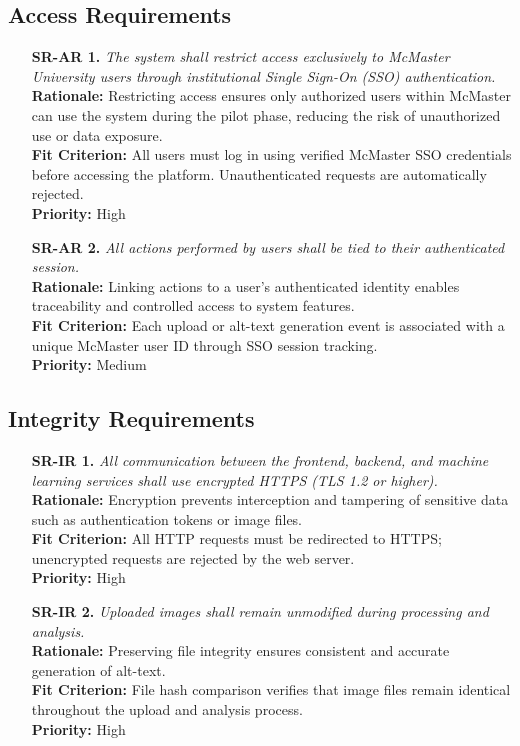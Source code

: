\documentclass[12pt]{article}
\begin{document}
\subsection{Access Requirements}
\begin{itemize}
  \item[\textbf{SR-AR 1.}] \textit{The system shall restrict access
      exclusively to McMaster University users through institutional
    Single Sign-On (SSO) authentication.}\\
    \textbf{Rationale:} Restricting access ensures only authorized
    users within McMaster can use the system during the pilot phase,
    reducing the risk of unauthorized use or data exposure.\\
    \textbf{Fit Criterion:} All users must log in using verified
    McMaster SSO credentials before accessing the platform.
    Unauthenticated requests are automatically rejected.\\
    \textbf{Priority:} High

  \item[\textbf{SR-AR 2.}] \textit{All actions performed by users
    shall be tied to their authenticated session.}\\
    \textbf{Rationale:} Linking actions to a user’s authenticated
    identity enables traceability and controlled access to system features.\\
    \textbf{Fit Criterion:} Each upload or alt-text generation event
    is associated with a unique McMaster user ID through SSO session tracking.\\
    \textbf{Priority:} Medium
\end{itemize}

\subsection{Integrity Requirements}
\begin{itemize}
  \item[\textbf{SR-IR 1.}] \textit{All communication between the
      frontend, backend, and machine learning services shall use
    encrypted HTTPS (TLS 1.2 or higher).}\\
    \textbf{Rationale:} Encryption prevents interception and
    tampering of sensitive data such as authentication tokens or image files.\\
    \textbf{Fit Criterion:} All HTTP requests must be redirected to
    HTTPS; unencrypted requests are rejected by the web server.\\
    \textbf{Priority:} High

  \item[\textbf{SR-IR 2.}] \textit{Uploaded images shall remain
    unmodified during processing and analysis.}\\
    \textbf{Rationale:} Preserving file integrity ensures consistent
    and accurate generation of alt-text.\\
    \textbf{Fit Criterion:} File hash comparison verifies that image
    files remain identical throughout the upload and analysis process.\\
    \textbf{Priority:} High
\end{itemize}
\end{document}
